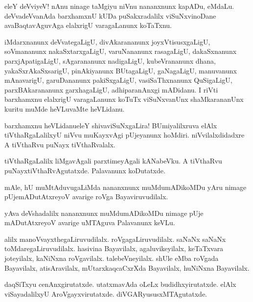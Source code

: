 \begin{mng}
eleY deVviyeV! nAnu ninage taMgiyu niVnu nananxnunx kapADu, eMdaLu. deVvadeVvanAda barxhamxnU kUDa puSakxradalilx viSuNxvinoDane avaBaqtavAguvAga elalxrigU varagaLanunx koTaTxnu.
\end{mng}

\begin{mng}
iMdarxnanunx deVvategaLigU, divAkarananunx joyxVtisusxgaLigU, soVmananunx nakaSxtarxgaLigU, varuNananunx rasagaLigU, dakaSxnanunx parxjApatigaLigU, sAgarananunx nadigaLigU, kubeVrananunx dhana, yakaSxrAkaSxsarigU, pinAkiyanunx BUtagaLigU, gaNagaLigU, manuvanunx mAnavarigU, garuDananunx pakiSxgaLigU, vasiSaThxnanunx QuSigaLigU, parxBAkarananunx garxhagaLigU, adhiparanAnxgi mADidanu. I riVti barxhamxnu elalxrigU varagaLanunx koTuTx viSuNxvanUnx shaMkarananUnx kuritu muMde heVLuvaMte heVLidanu.
\end{mng}

\begin{mng}
barxhamxnu heVLidanu\mdash eleY shivaviSuNxgaLira! BUmiyalilxruva elAlx tiVthaRgaLalilxyU niVvu muKayxvAgi pUjeyanunx hoMdiri. niVvilalxdidadxre A tiVthaRvu puNayx tiVthaRvalalx.
\end{mng}

\begin{mng}
tiVthaRgaLalilx liMgavAgali parxtimeyAgali kANabeVku. A tiVthaRvu puNayxtiVthaRvAgutatxde. Palavanunx koDutatxde.
\end{mng}

\begin{mng}
mAle, hU muMtAduvugaLiMda nananxnunx muMdumADikoMDu yAru nimage pUjemADutAtxreyoV avarige roVga Bayaviruvudilalx.
\end{mng}

\begin{mng}
yAva deVshadalilx nananxnunx muMdumADikoMDu nimage pUje mADutAtxreyoV avarige uMTAguva Palavanunx keVLu.
\end{mng}

\begin{mng}
alilx manoVvayxthegaLiruvudilalx. roVgagaLiruvudilalx. saNaNx saNaNx toMdaregaLiruvudilalx. hasivina Bayavilalx, agaluvikeyilalx, keTaTxvara joteyilalx, kaNiNxna roVgavilalx. talebeVneyilalx. shUle eMba roVgada Bayavilalx, atisAravilalx, mUtarxkaqcaCxrXda Bayavilalx, huNiNxna Bayavilalx.
\end{mng}

\begin{mng}
daqSiTxyu cenAnxgirutatxde. utatxmavAda oLeLx budidhxyirutatxde. elAlx viSayadalilxyU AroVgayxvirutatxde. diVGARyususxMTAgutatxde.
\end{mng}

